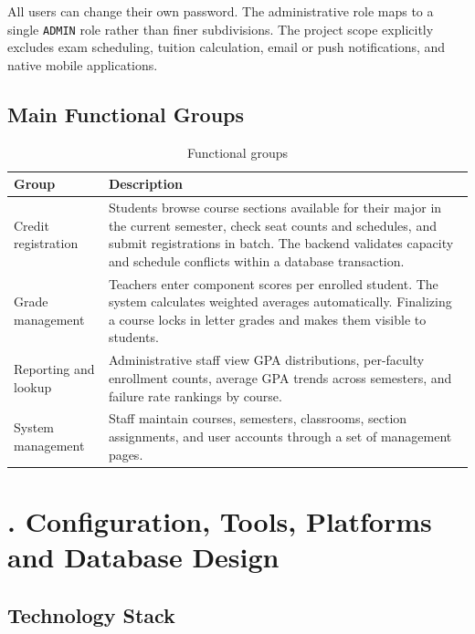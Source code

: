 \documentclass[12pt,a4paper]{report}
\begin{document}
All users can change their own password. The administrative role maps to a single \texttt{ADMIN} role rather than finer subdivisions. The project scope explicitly excludes exam scheduling, tuition calculation, email or push notifications, and native mobile applications.

\section{Main Functional Groups}

\begin{table}[H]
\renewcommand{\arraystretch}{1.35}
\caption{Functional groups}
\label{tab:funcgroups}
\begin{tabular}{|p{4.2cm}|p{9.5cm}|}
  \hline
  \textbf{Group} & \textbf{Description} \\
  \hline
  Credit registration & Students browse course sections available for their major in the current semester, check seat counts and schedules, and submit registrations in batch. The backend validates capacity and schedule conflicts within a database transaction. \\
  \hline
  Grade management & Teachers enter component scores per enrolled student. The system calculates weighted averages automatically. Finalizing a course locks in letter grades and makes them visible to students. \\
  \hline
  Reporting and lookup & Administrative staff view GPA distributions, per-faculty enrollment counts, average GPA trends across semesters, and failure rate rankings by course. \\
  \hline
  System management & Staff maintain courses, semesters, classrooms, section assignments, and user accounts through a set of management pages. \\
  \hline
\end{tabular}
\end{table}

\chapter{. Configuration, Tools, Platforms and Database Design}

\section{Technology Stack}
\end{document}
